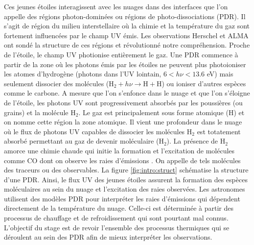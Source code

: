 \documentclass[11pt,a4paper]{article}
\begin{document}
\begin{spacing}{0.98}
Ces jeunes étoiles interagissent avec les nuages dans des interfaces que l'on appelle des régions photon-dominées ou régions de photo-dissociations (PDR). Il s'agit de région du milieu interstellaire où la chimie et la température du gaz sont fortement influencées par le champ UV émis. Les observations Herschel et ALMA ont sondé la structure de ces régions et révolutionné notre compréhension\cite{Goicoechea2016}.
Proche de l'étoile, le champ UV photionise entièrement le gaz. Une PDR commence à partir de la zone où les photons émis par les étoiles ne peuvent plus photoioniser les atomes d'hydrogène (photons dans l'UV lointain, $6<h\nu<13.6$ eV) mais seulement dissocier des molécules ($\mathrm{H}_2 + h\nu \rightarrow \mathrm{H}+\mathrm{H}$) ou ioniser d'autres espèces comme le carbone. A mesure que l'on s'enfonce dans le nuage et que l'on s'éloigne de l'étoile, les photons UV sont progressivement absorbés par les poussières (ou grains) et la molécule $\mathrm{H}_2$.
Le gaz est principalement sous forme atomique ($\mathrm{H}$) et on nomme cette région la zone atomique. Il vient une profondeur dans le nuage où le flux de photons UV capables de dissocier les molécules $\mathrm{H}_2$ est totatement absorbé permettant au gaz de devenir moléculaire ($\mathrm{H}_2$). La présence de $\mathrm{H}_2$ amorce une chimie chaude qui initie la formation et l'excitation de molécules comme $\mathrm{CO}$ dont on observe les raies d'émissions \cite{COJoblin}. On appelle de tels molécules des traceurs ou des observables. La figure \ref{fig:intro:struct} schématise la structure d'une PDR. Ainsi, le flux UV des jeunes étoiles assurent la formation des espèces moléculaires au sein du nuage et l'excitation des raies observées. Les astronomes utilisent des modèles PDR pour interpréter les raies d'émissions qui dépendent directement de la température du nuage. Celle-ci est déterminée à partir des processus de chauffage et de refroidissement qui sont pourtant mal connus. L'objectif du stage est de revoir l'ensemble des processus thermiques qui se déroulent au sein des PDR afin de mieux interpréter les observations. \newline 


\end{spacing}
\end{document}
